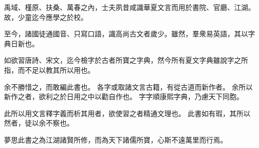 禹域、槿原、扶桑、萬春之內，士夫夙昔咸識華夏文言而用於書院、官廳、江湖。
故，少童迄今應學之於校。

至今，諸國徒通國音、只寫口語，識高尚古文者歲少。雖然，羣衆易英語，其以字典日新也。

如欲習唐詩、宋文，迄今檢字於古者所寶之字典，然今所有夏文字典雖說字之所指，而不足以教其所以用也。

余不勝惜之，而敢編此書也。
各字或取諸文言古籍，有從古道而新作者。
余所以新作之者，欲利之於日用之中以勸自作也。
字字順康熙字典，乃慮天下同胞。

此所以用文言釋字義而析其用者，欲使習之者精通文理也。
此書如有瑕，其所以然者，徒以余不察也。

夢思此書之為江湖諸賢所修，而為天下諸儒所寶，心斯不遠萬里而行焉。
